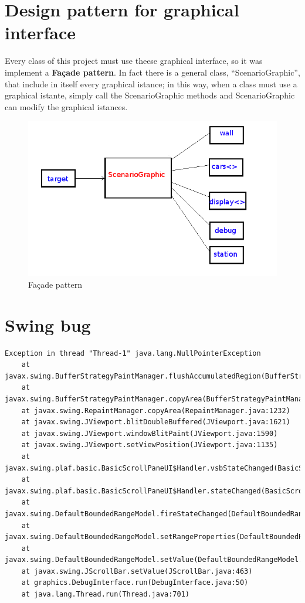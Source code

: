 \documentclass[a4paper,titlepage]{article}
\begin{document}
\section{Design pattern for graphical interface}

Every class of this project must use theese graphical interface, so it was implement a \textbf{Façade pattern}. In fact there is a general class, ``ScenarioGraphic'', that include in itself every graphical istance; in this way, when a class must use a graphical istante, simply call the ScenarioGraphic methods and ScenarioGraphic can modify the graphical istances. 

\begin{figure}[!h]
\centering
\includegraphics[scale=0.5]{facade.png}
\caption{Façade pattern}
\end{figure}



\section{Swing bug}

\begin{verbatim}
Exception in thread "Thread-1" java.lang.NullPointerException
	at javax.swing.BufferStrategyPaintManager.flushAccumulatedRegion(BufferStrategyPaintManager.java:427)
	at javax.swing.BufferStrategyPaintManager.copyArea(BufferStrategyPaintManager.java:351)
	at javax.swing.RepaintManager.copyArea(RepaintManager.java:1232)
	at javax.swing.JViewport.blitDoubleBuffered(JViewport.java:1621)
	at javax.swing.JViewport.windowBlitPaint(JViewport.java:1590)
	at javax.swing.JViewport.setViewPosition(JViewport.java:1135)
	at javax.swing.plaf.basic.BasicScrollPaneUI$Handler.vsbStateChanged(BasicScrollPaneUI.java:1044)
	at javax.swing.plaf.basic.BasicScrollPaneUI$Handler.stateChanged(BasicScrollPaneUI.java:1033)
	at javax.swing.DefaultBoundedRangeModel.fireStateChanged(DefaultBoundedRangeModel.java:365)
	at javax.swing.DefaultBoundedRangeModel.setRangeProperties(DefaultBoundedRangeModel.java:302)
	at javax.swing.DefaultBoundedRangeModel.setValue(DefaultBoundedRangeModel.java:168)
	at javax.swing.JScrollBar.setValue(JScrollBar.java:463)
	at graphics.DebugInterface.run(DebugInterface.java:50)
	at java.lang.Thread.run(Thread.java:701)
\end{verbatim}
\end{document}
